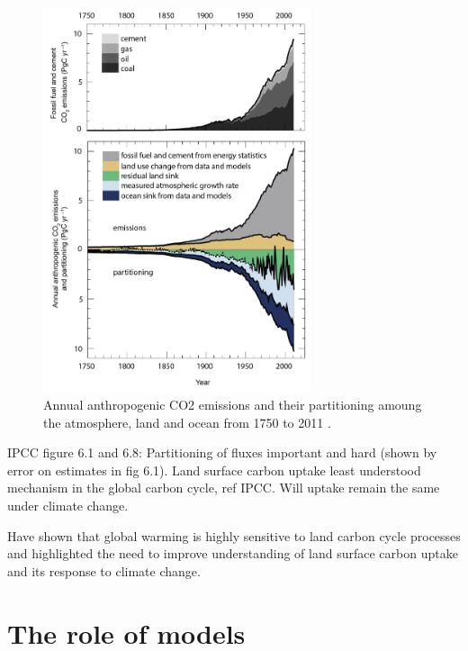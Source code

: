 \documentclass[11pt]{article}
\begin{document}
\begin{figure}[ht]
    \centering
    \includegraphics[width=0.7\textwidth]{ipcc_fig6_8.jpg}
    \caption{Annual anthropogenic CO2 emissions and their partitioning amoung the atmosphere, land and ocean from 1750 to 2011  \citep{ciais2014carbon}.}
    \label{fig:ipcc_fig6.8}
\end{figure}

IPCC figure 6.1 and 6.8: Partitioning of fluxes important and hard (shown by error on estimates in fig 6.1). Land surface carbon uptake least understood mechanism in the global carbon cycle, ref IPCC. Will uptake remain the same under climate change.

\citet{1748-9326-7-2-024002} Have shown that global warming is highly sensitive to land carbon cycle processes and highlighted the need to improve understanding of land surface carbon uptake and its response to climate change. 

\section{The role of models}
\end{document}
